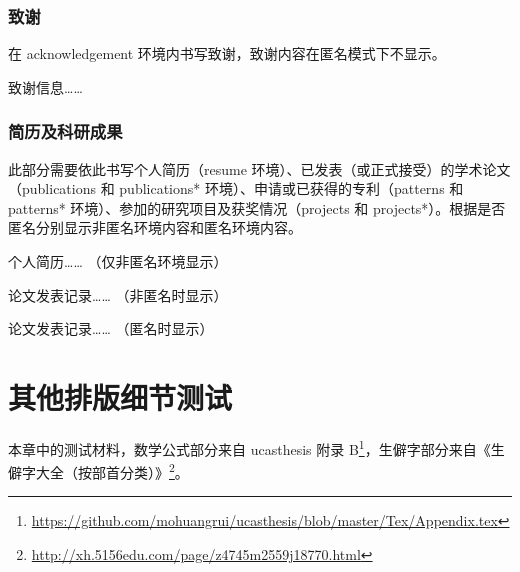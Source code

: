 \documentclass[master]{shtthesis}
\begin{document}
\subsection{致谢}
在 acknowledgement 环境内书写致谢，致谢内容在匿名模式下不显示。
\begin{latex}
\begin{acknowledgement}
  致谢信息……
\end{acknowledgement}
\end{latex}

\subsection{简历及科研成果}
此部分需要依此书写个人简历（resume 环境）、已发表（或正式接受）的学术论文（publications 和 publications* 环境）、申请或已获得的专利（patterns 和 patterns* 环境）、参加的研究项目及获奖情况（projects 和 projects*）。根据是否匿名分别显示非匿名环境内容和匿名环境内容。
\begin{latex}
\begin{resume}
  个人简历…… （仅非匿名环境显示）
\end{resume}

\begin{publications}
  论文发表记录…… （非匿名时显示）
\end{publications}

\begin{publications*}
  论文发表记录…… （匿名时显示）
\end{publications*}
\end{latex}

\makebiblio

\appendix
\chapter{其他排版细节测试}
本章中的测试材料，数学公式部分来自 \textsf{ucasthesis} 附录 B\footnote{\url{https://github.com/mohuangrui/ucasthesis/blob/master/Tex/Appendix.tex}}，生僻字部分来自《生僻字大全（按部首分类）》\footnote{\url{http://xh.5156edu.com/page/z4745m2559j18770.html}}。
\end{document}
